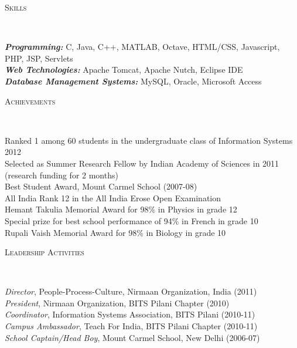 \documentclass[9pt]{article}
\newenvironment{changemargin}[2]{%
  \begin{list}{}{%
    \setlength{\topsep}{0pt}%
    \setlength{\leftmargin}{#1}%
    \setlength{\rightmargin}{#2}%
    \setlength{\listparindent}{\parindent}%
    \setlength{\itemindent}{\parindent}%
    \setlength{\parsep}{\parskip}%
  }%
  \item[]}{\end{list}
}
\newcommand{\lineover}{
	\begin{changemargin}{-0.05in}{-0.05in}
		\vspace*{-8pt}
		\hrulefill \\
		\vspace*{-2pt}
	\end{changemargin}
}
\newcommand{\header}[1]{
	\begin{changemargin}{-0.5in}{-0.5in}
		\scshape{#1}\\
  	\lineover
	\end{changemargin}
}
\newenvironment{body} {
	\vspace*{-16pt}
	\begin{changemargin}{-0.25in}{-0.5in}
  }	
	{\end{changemargin}
}
\begin{document}
\smallskip

\header{Skills}

\begin{body}
	\vspace{14pt}
	\emph{\textbf{Programming:}}{} C, Java, C++, MATLAB, Octave, HTML/CSS, Javascript, PHP, JSP, Servlets \\
	\medskip
	\emph{\textbf{Web Technologies:}}{} Apache Tomcat, Apache Nutch, Eclipse IDE \\
	\medskip
	\emph{\textbf{Database Management Systems:}}{} MySQL, Oracle, Microsoft Access
\end{body}

\smallskip

\header{Achievements}

\begin{body}
	\vspace{14pt}
	Ranked 1 among 60 students in the undergraduate class of Information Systems 2012 \\
	Selected as Summer Research Fellow by Indian Academy of Sciences in 2011 (research funding for 2 months) \\
	Best Student Award, Mount Carmel School (2007-08) \\
	All India Rank 12 in the All India Erose Open Examination \\
	Hemant Takulia Memorial Award for 98\% in Physics in grade 12 \\
	Special prize for best school performance of 94\% in French in grade 10 \\
	Rupali Vaish Memorial Award for 98\% in Biology in grade 10 \\
\end{body}

\smallskip


\header{Leadership Activities}

\begin{body}
	\vspace{14pt}
	\emph{Director}, People-Process-Culture, Nirmaan Organization, India (2011) \\
	\emph{President}, Nirmaan Organization, BITS Pilani Chapter (2010) \\
	\emph{Coordinator}, Information Systems Association, BITS Pilani (2010-11) \\
	\emph{Campus Ambassador}, Teach For India, BITS Pilani Chapter (2010-11) \\
	\emph{School Captain/Head Boy}, Mount Carmel School, New Delhi (2006-07) \\
\end{body}
\end{document}
